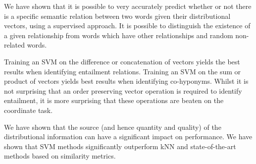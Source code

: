 \documentclass[11pt]{article}
\begin{document}
We have shown that it is possible to very accurately predict whether
or not there is a specific semantic relation between two words given
their distributional vectors, using a supervised approach.
It is possible to distinguish the existence of a given relationship
from words which have other relationships and random non-related
words.

Training an SVM on the difference or concatenation of vectors yields the best results when identifying entailment relations.  Training an SVM on the sum or product of vectors yields best results when identifying co-hyponyms.  Whilst it is not surprising that an order preserving vector operation is required to identify entailment, it is more surprising that these operations are beaten on the coordinate task.  

We have shown that the source (and hence quantity and quality) of the distributional information can have a significant impact on performance.  We have shown that SVM methods significantly outperform kNN and state-of-the-art methods based on similarity metrics. 











\end{document}
